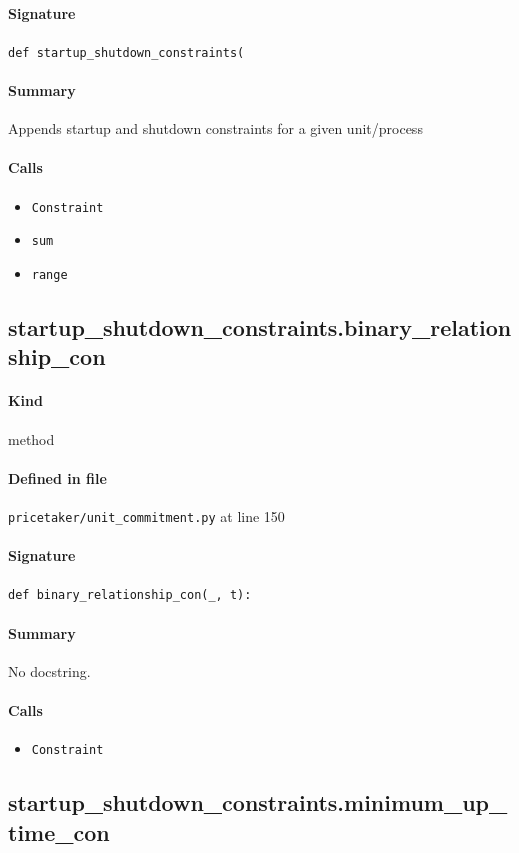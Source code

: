 \documentclass[11pt]{report}
\begin{document}
\paragraph{Signature} \texttt{def startup\_shutdown\_constraints(}
\paragraph{Summary} Appends startup and shutdown constraints for a given unit/process
\paragraph{Calls}
\begin{itemize}[leftmargin=*]
  \item \texttt{Constraint}
  \item \texttt{sum}
  \item \texttt{range}
\end{itemize}
\subsection{startup\_shutdown\_constraints.binary\_relationship\_con}
\label{def:pricetaker-unit_commitment.py:startup_shutdown_constraints.binary_relationship_con:L150}
\paragraph{Kind} method
\paragraph{Defined in file} \texttt{pricetaker/unit\_commitment.py} at line 150
\paragraph{Signature} \texttt{def binary\_relationship\_con(\_, t):}
\paragraph{Summary} No docstring.
\paragraph{Calls}
\begin{itemize}[leftmargin=*]
  \item \texttt{Constraint}
\end{itemize}
\subsection{startup\_shutdown\_constraints.minimum\_up\_time\_con}
\label{def:pricetaker-unit_commitment.py:startup_shutdown_constraints.minimum_up_time_con:L160}
\end{document}
